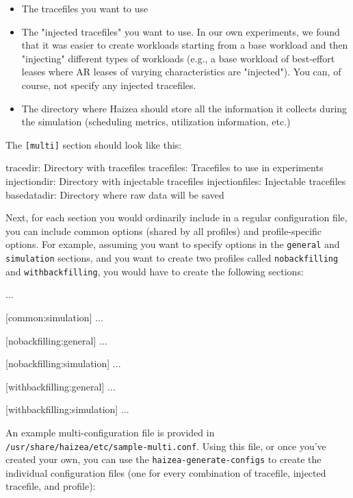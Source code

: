 \begin{itemize}
\item The tracefiles you want to use
\item The "injected tracefiles" you want to use. In our own experiments, we found that it was easier to create workloads starting from a base workload and then "injecting" different types of workloads (e.g., a base workload of best-effort leases where AR leases of varying characteristics are "injected"). You can, of course, not specify any injected tracefiles.
\item The directory where Haizea should store all the information it collects during the simulation (scheduling metrics, utilization information, etc.)
\end{itemize}

The \texttt{[multi]} section should look like this:

\begin{wideshellverbatim}
[multi]
tracedir: Directory with tracefiles
tracefiles: Tracefiles to use in experiments
injectiondir: Directory with injectable tracefiles
injectionfiles: Injectable tracefiles
basedatadir: Directory where raw data will be saved
\end{wideshellverbatim}

Next, for each section you would ordinarily include in a regular configuration file, you can include common options (shared by all profiles) and profile-specific options. For example, assuming you want to specify options in the \texttt{general} and \texttt{simulation} sections, and you want to create two profiles called \texttt{nobackfilling} and \texttt{withbackfilling}, you would have to create the following sections:

\begin{wideshellverbatim}
...

[common:simulation]
...

[nobackfilling:general]
...

[nobackfilling:simulation]
...

[withbackfilling:general]
...

[withbackfilling:simulation]
...
\end{wideshellverbatim}

An example multi-configuration file is provided in \texttt{/usr/share/haizea/etc/sample-multi.conf}. Using this file, or once you've created your own, you can use the \texttt{haizea-generate-configs} to create the individual configuration files (one for every combination of tracefile, injected tracefile, and profile):

